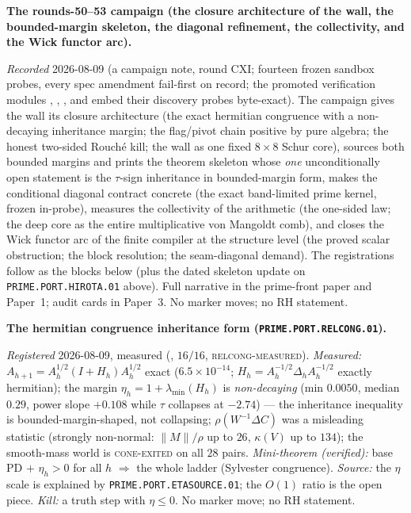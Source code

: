 \documentclass[11pt,a4paper]{article}
\begin{document}
\par\smallskip\noindent\textbf{The rounds-50--53 campaign (the
closure architecture of the wall, the bounded-margin skeleton,
the diagonal refinement, the collectivity, and the Wick
functor arc).}
{\sloppy
\emph{Recorded} 2026-08-09 (a campaign note, round CXI;
fourteen frozen sandbox probes, every spec amendment
fail-first on record; the promoted verification modules
,
,
,
 and
 embed their discovery
probes byte-exact).  The campaign gives the wall its closure
architecture (the exact hermitian congruence with a
non-decaying inheritance margin; the flag/pivot chain positive
by pure algebra; the honest two-sided Rouch\'e kill; the wall
as one fixed $8\times8$ Schur core), sources both bounded
margins and prints the theorem skeleton whose \emph{one}
unconditionally open statement is the $\tau$-sign inheritance
in bounded-margin form, makes the conditional diagonal
contract concrete (the exact band-limited prime kernel, frozen
in-probe), measures the collectivity of the arithmetic (the
one-sided law; the deep core as the entire multiplicative von
Mangoldt comb), and closes the Wick functor arc of the finite
compiler at the structure level (the proved scalar
obstruction; the block resolution; the seam-diagonal demand).
The registrations follow as the blocks below (plus the dated
skeleton update on \texttt{PRIME.PORT.HIROTA.01} above).  Full
narrative in the prime-front paper and Paper~1; audit cards in
Paper~3.  No marker moves; no RH statement.\par}

\par\smallskip\noindent\textbf{The hermitian congruence
inheritance form
(\texttt{PRIME.PORT.\allowbreak RELCONG.01}).}
{\sloppy
\emph{Registered} 2026-08-09, measured
(, $16/16$,
\textsc{relcong-measured}).  \emph{Measured:} $A_{h+1} =
A_h^{1/2}(I + H_h)A_h^{1/2}$ exact ($6.5\times10^{-14}$; $H_h
= A_h^{-1/2}\Delta_h A_h^{-1/2}$ exactly hermitian); the
margin $\eta_h = 1 + \lambda_{\min}(H_h)$ is
\emph{non-decaying} (min $0.0050$, median $0.29$, power slope
$+0.108$ while $\tau$ collapses at $-2.74$) --- the
inheritance inequality is bounded-margin-shaped, not
collapsing; $\rho(W^{-1}\Delta C)$ was a misleading statistic
(strongly non-normal: $\|M\|/\rho$ up to $26$, $\kappa(V)$ up
to $134$); the smooth-mass world is \textsc{cone-exited} on
all $28$ pairs.  \emph{Mini-theorem (verified):} base PD $+$
$\eta_h > 0$ for all $h$ $\Rightarrow$ the whole ladder
(Sylvester congruence).  \emph{Source:} the $\eta$ scale is
explained by \texttt{PRIME.PORT.ETASOURCE.01}; the $O(1)$
ratio is the open piece.  \emph{Kill:} a truth step with
$\eta \le 0$.  No marker move; no RH statement.\par}
\end{document}
